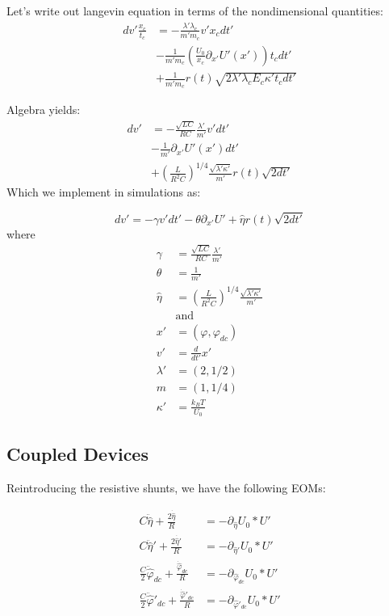 \documentclass[paper=a4, twocolumn, fontsize=10pt]{article} %
\numberwithin{equation}{section} %
\numberwithin{figure}{section} %
\numberwithin{table}{section} %
\def \df#1{\hat{#1}}
\def \dl#1{#1}
\begin{document}
Let's write out langevin equation in terms of the nondimensional quantities:
\begin{align*}
dv' \frac{x_c}{t_c} &= -\frac{\lambda' \lambda_c}{m' m_c} v' x_c  dt' \\
 &- \frac{1}{m' m_c} \left(\frac{U_0}{x_c} \partial_{x'} U'(x')\right)  t_c dt' \\
  &+ \frac{1}{m'm_c} r(t)\sqrt{2\lambda'\lambda_c E_c \kappa' t_c dt'}
\end{align*}
    
Algebra yields:
\begin{align*}
dv' &= -\frac{\sqrt{LC} }{ RC} \frac{\lambda'}{m'} v' dt' \\
&- \frac{1 }{ m'}  \partial_{x'} U'(x') dt' \\
&+ \left(  \frac{L}{R^2 C} \right)^{1/4} \frac{\sqrt{\lambda'\kappa'}}{m'} r(t) \sqrt {2 dt'}
\end{align*}
Which we implement in simulations as:

 \[ dv' = -\gamma v' dt' - \theta \partial_{x'} U' + \df\eta r(t) \sqrt{2dt'} \]
where
\begin{align*}
    \gamma &=  \frac{\sqrt{LC} }{ RC} \frac{\lambda'}{m'}  \\
    \theta &= \frac{1 }{ m'} \\
    \df\eta &= \left(  \frac{L}{R^2 C} \right)^{1/4} \frac{\sqrt{\lambda'\kappa'}}{m'} \\
    &\text{and} \\
    x' &= (\dl\varphi, \dl\varphi_{dc}) \\
    v' &= \frac{d}{dt'} x' \\
    \lambda' &= (2, 1/2) \\
    m &= ( 1, 1/4) \\
    \kappa' &= \frac{k_B T}{U_0}
\end{align*}

\subsection{Coupled Devices}

Reintroducing the resistive shunts, we have the following EOMs:

\begin{align*}
    C \ddot{\df\eta} + \frac{2 \dot{\df\eta}}{R} &= -\partial_{\df\eta} U_0 * U' \\
    C \ddot{\df\eta}' + \frac{2 \dot{\df\eta'}}{R}  &= -\partial_{\df\eta'} U_0 * U' \\
\frac{C}{2} \ddot{\df\varphi}_{dc} + \frac{\dot{\df\varphi}_{dc}}{R} &= -\partial_{\df\varphi_{dc}} U_0 * U' \\
\frac{C}{2} \ddot{\df\varphi}'_{dc} + \frac{\dot{\df\varphi}'_{dc}}{R} &= -\partial_{\df\varphi'_{dc}} U_0 * U'
\end{align*}
\end{document}
